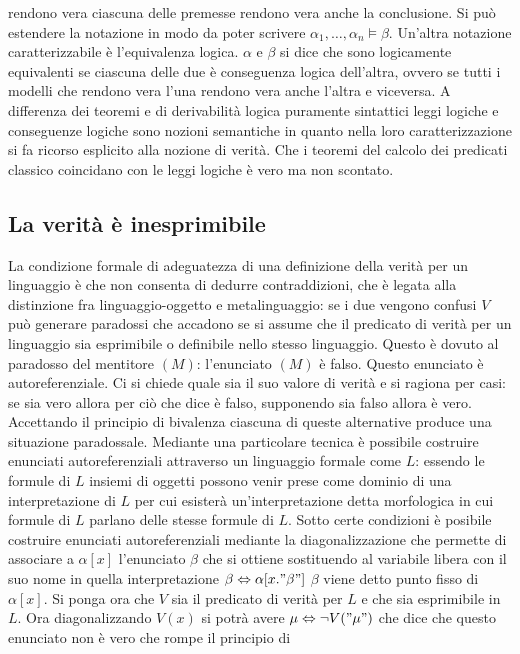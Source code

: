 rendono vera ciascuna delle premesse rendono vera anche la conclusione. Si pu\`o estendere la notazione in modo da poter scrivere $\alpha_1, \dots, \alpha_n\models\beta$. Un'altra notazione caratterizzabile 
\`e l'equivalenza logica. $\alpha$ e $\beta$ si dice che sono logicamente equivalenti se ciascuna delle due \`e conseguenza logica dell'altra, ovvero se tutti i modelli che rendono vera l'una rendono vera anche 
l'altra e viceversa. A differenza dei teoremi e di derivabilit\`a logica puramente sintattici leggi logiche e conseguenze logiche sono nozioni semantiche in quanto nella loro caratterizzazione si fa ricorso esplicito 
alla nozione di verit\`a. Che i teoremi del calcolo dei predicati classico coincidano con le leggi logiche \`e vero ma non scontato. 
\subsection{La verit\`a \`e inesprimibile}
La condizione formale di adeguatezza di una definizione della verit\`a per un linguaggio \`e che non consenta di dedurre contraddizioni, che \`e legata alla distinzione fra linguaggio-oggetto e metalinguaggio: se i 
due vengono confusi $V$ pu\`o generare paradossi che accadono se si assume che il predicato di verit\`a per un linguaggio sia esprimibile o definibile nello stesso linguaggio. Questo \`e dovuto al paradosso del 
mentitore $(M)$: l'enunciato $(M)$ \`e falso. Questo enunciato \`e autoreferenziale. Ci si chiede quale sia il suo valore di verit\`a e si ragiona per casi: se sia vero allora per ci\`o che dice \`e falso, supponendo sia 
falso allora \`e vero. Accettando il principio di bivalenza ciascuna di queste alternative produce una situazione paradossale. Mediante una particolare tecnica \`e possibile costruire enunciati autoreferenziali 
attraverso un linguaggio formale come $L$: essendo le formule di $L$ insiemi di oggetti possono venir prese come dominio di una interpretazione di $L$ per cui esister\`a un'interpretazione detta morfologica 
in cui formule di $L$ parlano delle stesse formule di $L$. Sotto certe condizioni \`e posibile costruire enunciati autoreferenziali mediante la diagonalizzazione che permette di associare a $\alpha[x]$ l'enunciato 
$\beta$ che si ottiene sostituendo al variabile libera con il suo nome in quella interpretazione $\beta\Leftrightarrow\alpha[x."\beta"]$ $\beta$ viene detto punto fisso di $\alpha[x]$. Si ponga ora che $V$ sia il 
predicato di verit\`a per $L$ e che sia esprimibile in $L$. Ora diagonalizzando $V(x)$ si potr\`a avere $\mu\Leftrightarrow\neg V("\mu")$ che dice che questo enunciato non \`e vero che rompe il principio di 

